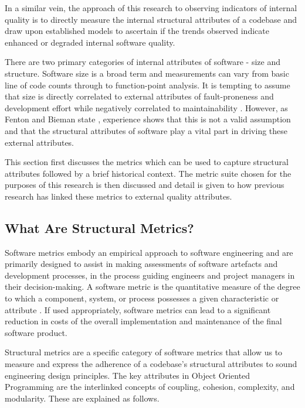 In a similar vein, the approach of this research to observing indicators of internal quality is to directly measure the internal structural attributes of a codebase and draw upon established models to ascertain if the trends observed indicate enhanced or degraded internal software quality.

There are two primary categories of internal attributes of software - size and structure. Software size is a broad term and measurements can vary from basic line of code counts through to function-point analysis. It is tempting to assume that size is directly correlated to external attributes of fault-proneness and development effort while negatively correlated to maintainability \citep{akiyama1971example}. However, as Fenton and Bieman state \citep{fenton2014software}, experience shows that this is not a valid assumption and that the structural attributes of software play a vital part in driving these external attributes.
 
This section first discusses the metrics which can be used to capture structural attributes followed by a brief historical context. The metric suite chosen for the purposes of this research is then discussed and detail is given to how previous research has linked these metrics to external quality attributes.

\subsection{What Are Structural Metrics?}
Software metrics embody an empirical approach to software engineering and are primarily designed to assist in making assessments of software artefacts and development processes, in the process guiding engineers and project managers in their decision-making. A software metric is the quantitative measure of the degree to which a component, system, or process possesses a given characteristic or attribute \citep{ordonez2008state}. If used appropriately, software metrics can lead to a significant reduction in costs of the overall implementation and maintenance of the final software product. 

Structural metrics are a specific category of software metrics that allow us to measure and express the adherence of a codebase's structural attributes to sound engineering design principles. The key attributes in Object Oriented Programming are the interlinked concepts of coupling, cohesion, complexity, and modularity. These are explained as follows.

